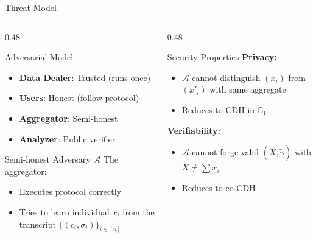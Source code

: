 \documentclass[aspectratio=169,10pt]{beamer}
\newcommand{\G}{\mathbb{G}}
\newcommand{\Adv}{\mathcal{A}}
\begin{document}
\begin{frame}{Threat Model}
    \begin{columns}[T]
        \begin{column}{0.48\textwidth}
            \begin{block}{Adversarial Model}
                \begin{itemize}
                    \item \textbf{Data Dealer}: Trusted (runs once)
                    \item \textbf{Users}: Honest (follow protocol)
                    \item \textbf{Aggregator}: \textcolor{danger}{Semi-honest}
                    \item \textbf{Analyzer}: Public verifier
                \end{itemize}
            \end{block}

            \vspace{0.3em}

            \begin{block}{Semi-honest Adversary $\Adv$}
                The aggregator:
                \begin{itemize}
                    \item Executes protocol correctly
                    \item Tries to learn individual $x_i$ from the transcript $\{(c_i, \sigma_i)\}_{i \in [n]}$
                \end{itemize}
            \end{block}
        \end{column}
        \begin{column}{0.48\textwidth}
            \begin{block}{Security Properties}
                \textbf{Privacy:}
                \begin{itemize}
                    \item $\Adv$ cannot distinguish $(x_i)$ from $(x'_i)$ with same aggregate
                    \item Reduces to CDH in $\G_1$
                \end{itemize}

                \vspace{0.3em}
                \textbf{Verifiability:}
                \begin{itemize}
                    \item $\Adv$ cannot forge valid $(\tilde{X}, \tilde{\gamma})$ with $\tilde{X} \neq \sum x_i$
                    \item Reduces to co-CDH
                \end{itemize}


\end{block}
\end{column}
\end{columns}
\end{frame}
\end{document}
